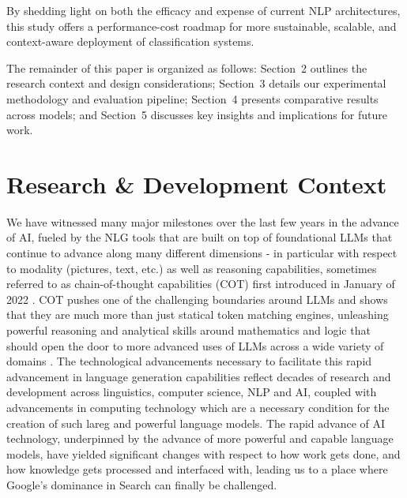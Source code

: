 \documentclass[final]{clv2025}
\begin{document}
By shedding light on both the efficacy and expense of current NLP architectures, this study offers a performance-cost roadmap for more sustainable, scalable, and context-aware deployment of classification systems. 

The remainder of this paper is organized as follows: Section~2 outlines the research context and design considerations; Section~3 details our experimental methodology and evaluation pipeline; Section~4 presents comparative results across models; and Section~5 discusses key insights and implications for future work.


\section{Research \& Development Context}

We have witnessed many major milestones over the last few years in the advance of AI, fueled by the NLG tools that are built on top of foundational LLMs that continue to advance along many different dimensions - in particular with respect to modality (pictures, text, etc.) as well as reasoning capabilities, sometimes referred to as chain-of-thought capabilities (COT) first introduced in January of 2022 \cite{articlewei}. COT pushes one of the challenging boundaries around LLMs and shows that they are much more than just statical token matching engines, unleashing powerful reasoning and analytical skills around mathematics and logic that should open the door to more advanced uses of LLMs across a wide variety of domains \cite{xu2025towards}. The technological advancements necessary to facilitate this rapid advancement in language generation capabilities reflect decades of research and development across linguistics, computer science, NLP and AI, coupled with advancements in computing technology which are a necessary condition for the creation of such lareg and powerful language models. The rapid advance of AI technology, underpinned by the advance of more powerful and capable language models, have yielded significant changes with respect to how work gets done, and how knowledge gets processed and interfaced with, leading us to a place where Google's dominance in Search can finally be challenged.
\end{document}
